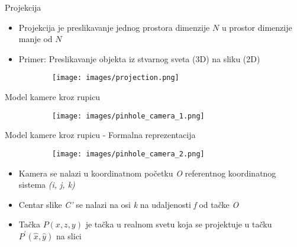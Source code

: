 \documentclass[bookmarks=true,bookmarksopen=true,pdfborder={0 0 0},pdfhighlight={/N},linkbordercolor={.5 .5 .5},implicit=false,unicode,xcolor={table}]{beamer}
\begin{document}
\begin{frame}{Projekcija}

  \begin{itemize}
    \item Projekcija je preslikavanje jednog prostora dimenzije $N$ u prostor dimenzije manje od $N$
    \item Primer: Preslikavanje objekta iz stvarnog sveta (3D) na sliku (2D)
  \end{itemize}
  \begin{figure}
    \begin{subfigure}{6cm}
      \texttt{[image: images/projection.png]}
    \end{subfigure}
  \end{figure}

\end{frame}

\begin{frame}{Model kamere kroz rupicu}

  \begin{figure}
    \begin{subfigure}{10cm}
      \texttt{[image: images/pinhole\_camera\_1.png]}
    \end{subfigure}
  \end{figure}

\end{frame}

\begin{frame}{Model kamere kroz rupicu - Formalna reprezentacija}

  \begin{figure}
    \begin{subfigure}{7cm}
      \texttt{[image: images/pinhole\_camera\_2.png]}
    \end{subfigure}
  \end{figure}
  \begin{itemize}
    \item Kamera se nalazi u koordinatnom početku \textit{O} referentnog koordinatnog sistema \textit{(i, j, k)}
    \item Centar slike \textit{C'} se nalazi na osi \textit{k} na udaljenosti \textit{f} od tačke \textit{O}
    \item Tačka $P (x, z, y)$ je tačka u realnom svetu koja se projektuje u tačku $P^{\prime} (\hat{x}, \hat{y})$ na slici 
  \end{itemize}
\end{frame}
\end{document}
